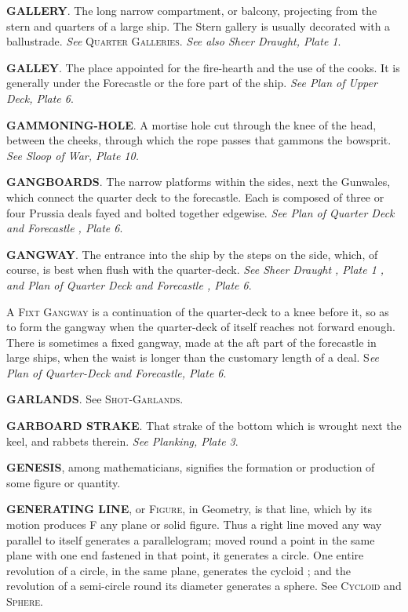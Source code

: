 \textbf{GALLERY}. The long narrow compartment, or balcony, projecting from the stern and quarters of a large ship. The Stern gallery is usually decorated with a ballustrade. \textit{See} \textsc{Quarter Galleries}. \textit{See also Sheer Draught, Plate 1}. 

\textbf{GALLEY}. The place appointed for the fire-hearth and the use of the cooks. It is generally under the Forecastle or the fore part of the ship. \textit{See Plan of Upper Deck, Plate 6}. 

\textbf{GAMMONING-HOLE}. A mortise hole cut through the knee of the head, between the cheeks, through which the rope passes that gammons the bowsprit. \textit{See Sloop of War, Plate 10.} 

\textbf{GANGBOARDS}. The narrow platforms within the sides, next the Gunwales, which connect the quarter deck to the forecastle. Each is composed of three or four Prussia deals fayed and bolted together edgewise. \textit{See Plan of Quarter Deck and Forecastle , Plate 6}. 

\textbf{GANGWAY}. The entrance into the ship by the steps on the side, which, of course, is best when flush with the quarter-deck. \textit{See Sheer Draught , Plate 1 , and Plan of Quarter Deck and Forecastle , Plate 6}. 

\textsc{A Fixt Gangway} is a continuation of the quarter-deck to a knee before it, so as to form the gangway when the quarter-deck of itself reaches not forward enough. There is sometimes a fixed gangway, made at the aft part of the forecastle in large ships, when the waist is longer than the customary length of a deal. S\textit{ee Plan of Quarter-Deck and Forecastle, Plate 6}. 

\textbf{GARLANDS}. See \textsc{Shot-Garlands}. 

\textbf{GARBOARD STRAKE}. That strake of the bottom which is wrought next the keel, and rabbets therein. \textit{See Planking, Plate 3}. 

\textbf{GENESIS}, among mathematicians, signifies the formation or production of some figure or quantity. 

\textbf{GENERATING LINE}, or \textsc{Figure}, in Geometry, is that line, which by its motion produces F any plane or solid figure. Thus a right line moved any way parallel to itself generates a parallelogram; moved round a point in the same plane with one end fastened in that point, it generates a circle. One entire revolution of a circle, in the same plane, generates the cycloid ; and the revolution of a semi-circle round its diameter generates a sphere. See \textsc{Cycloid} and \textsc{Sphere}. 

